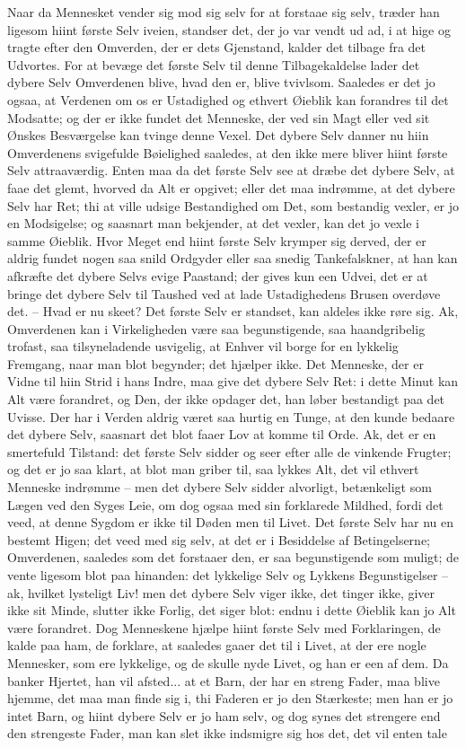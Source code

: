 \documentclass[12pt,a4paper]{article}
\begin{document}
Naar da Mennesket vender sig mod sig selv for at forstaae sig selv, træder han ligesom hiint første Selv iveien, standser det, der jo var vendt ud ad, i at hige og tragte efter den Omverden, der er dets Gjenstand, kalder det tilbage fra det Udvortes. For at bevæge det første Selv til denne Tilbagekaldelse lader det dybere Selv Omverdenen blive, hvad den er, blive tvivlsom. Saaledes er det jo ogsaa, at Verdenen om os er Ustadighed og ethvert Øieblik kan forandres til det Modsatte; og der er ikke fundet det Menneske, der ved sin Magt eller ved sit Ønskes Besværgelse kan tvinge denne Vexel. Det dybere Selv danner nu hiin Omverdenens svigefulde Bøielighed saaledes, at den ikke mere bliver hiint første Selv attraaværdig. Enten maa da det første Selv see at dræbe det dybere Selv, at faae det glemt, hvorved da Alt er opgivet; eller det maa indrømme, at det dybere Selv har Ret; thi at ville udsige Bestandighed om Det, som bestandig vexler, er jo en Modsigelse; og saasnart man bekjender, at det vexler, kan det jo vexle i samme Øieblik. Hvor Meget end hiint første Selv krymper sig derved, der er aldrig fundet nogen saa snild Ordgyder eller saa snedig Tankefalskner, at han kan afkræfte det dybere Selvs evige Paastand; der gives kun een Udvei, det er at bringe det dybere Selv til Taushed ved at lade Ustadighedens Brusen overdøve det. – Hvad er nu skeet? Det første Selv er standset, kan aldeles ikke røre sig. Ak, Omverdenen kan i Virkeligheden være saa begunstigende, saa haandgribelig trofast, saa tilsyneladende usvigelig, at Enhver vil borge for en lykkelig Fremgang, naar man blot begynder; det hjælper ikke. Det Menneske, der er Vidne til hiin Strid i hans Indre, maa give det dybere Selv Ret: i dette Minut kan Alt være forandret, og Den, der ikke opdager det, han løber bestandigt paa det Uvisse. Der har i Verden aldrig været saa hurtig en Tunge, at den kunde bedaare det dybere Selv, saasnart det blot faaer Lov at komme til Orde. Ak, det er en smertefuld Tilstand: det første Selv sidder og seer efter alle de vinkende Frugter; og det er jo saa klart, at blot man griber til, saa lykkes Alt, det vil ethvert Menneske indrømme – men det dybere Selv sidder alvorligt, betænkeligt som Lægen ved den Syges Leie, om dog ogsaa med sin forklarede Mildhed, fordi det veed, at denne Sygdom er ikke til Døden men til Livet. Det første Selv har nu en bestemt Higen; det veed med sig selv, at det er i Besiddelse af Betingelserne; Omverdenen, saaledes som det forstaaer den, er saa begunstigende som muligt; de vente ligesom blot paa hinanden: det lykkelige Selv og Lykkens Begunstigelser – ak, hvilket lysteligt Liv! men det dybere Selv viger ikke, det tinger ikke, giver ikke sit Minde, slutter ikke Forlig, det siger blot: endnu i dette Øieblik kan jo Alt være forandret. Dog Menneskene hjælpe hiint første Selv med Forklaringen, de kalde paa ham, de forklare, at saaledes gaaer det til i Livet, at der ere nogle Mennesker, som ere lykkelige, og de skulle nyde Livet, og han er een af dem. Da banker Hjertet, han vil afsted... at et Barn, der har en streng Fader, maa blive hjemme, det maa man finde sig i, thi Faderen er jo den Stærkeste; men han er jo intet Barn, og hiint dybere Selv er jo ham selv, og dog synes det strengere end den strengeste Fader, man kan slet ikke indsmigre sig hos det, det vil enten tale 
\end{document}
